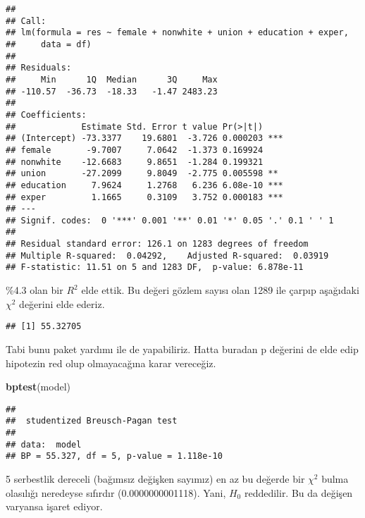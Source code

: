 \documentclass[
]{book}
\newenvironment{Shaded}{\begin{snugshade}}{\end{snugshade}}
\newcommand{\KeywordTok}[1]{\textcolor[rgb]{0.13,0.29,0.53}{\textbf{#1}}}
\newcommand{\NormalTok}[1]{#1}
\newcommand{\OperatorTok}[1]{\textcolor[rgb]{0.81,0.36,0.00}{\textbf{#1}}}
\newcommand{\StringTok}[1]{\textcolor[rgb]{0.31,0.60,0.02}{#1}}
\begin{document}
\begin{verbatim}
## 
## Call:
## lm(formula = res ~ female + nonwhite + union + education + exper, 
##     data = df)
## 
## Residuals:
##     Min      1Q  Median      3Q     Max 
## -110.57  -36.73  -18.33   -1.47 2483.23 
## 
## Coefficients:
##             Estimate Std. Error t value Pr(>|t|)    
## (Intercept) -73.3377    19.6801  -3.726 0.000203 ***
## female       -9.7007     7.0642  -1.373 0.169924    
## nonwhite    -12.6683     9.8651  -1.284 0.199321    
## union       -27.2099     9.8049  -2.775 0.005598 ** 
## education     7.9624     1.2768   6.236 6.08e-10 ***
## exper         1.1665     0.3109   3.752 0.000183 ***
## ---
## Signif. codes:  0 '***' 0.001 '**' 0.01 '*' 0.05 '.' 0.1 ' ' 1
## 
## Residual standard error: 126.1 on 1283 degrees of freedom
## Multiple R-squared:  0.04292,    Adjusted R-squared:  0.03919 
## F-statistic: 11.51 on 5 and 1283 DF,  p-value: 6.878e-11
\end{verbatim}

\%4.3 olan bir \(R^2\) elde ettik. Bu değeri gözlem sayısı olan 1289 ile çarpıp aşağıdaki \(\chi^2\) değerini elde ederiz.

\begin{Shaded}
\end{Shaded}

\begin{verbatim}
## [1] 55.32705
\end{verbatim}

Tabi bunu paket yardımı ile de yapabiliriz. Hatta buradan p değerini de elde edip hipotezin red olup olmayacağına karar vereceğiz.

\begin{Shaded}
\begin{Highlighting}[]
\KeywordTok{bptest}\NormalTok{(model)}
\end{Highlighting}
\end{Shaded}

\begin{verbatim}
## 
##  studentized Breusch-Pagan test
## 
## data:  model
## BP = 55.327, df = 5, p-value = 1.118e-10
\end{verbatim}

5 serbestlik dereceli (bağımsız değişken sayımız) en az bu değerde bir \(\chi^2\) bulma olasılığı neredeyse sıfırdır (0.0000000001118). Yani, \(H_0\) reddedilir. Bu da değişen varyansa işaret ediyor.
\end{document}
